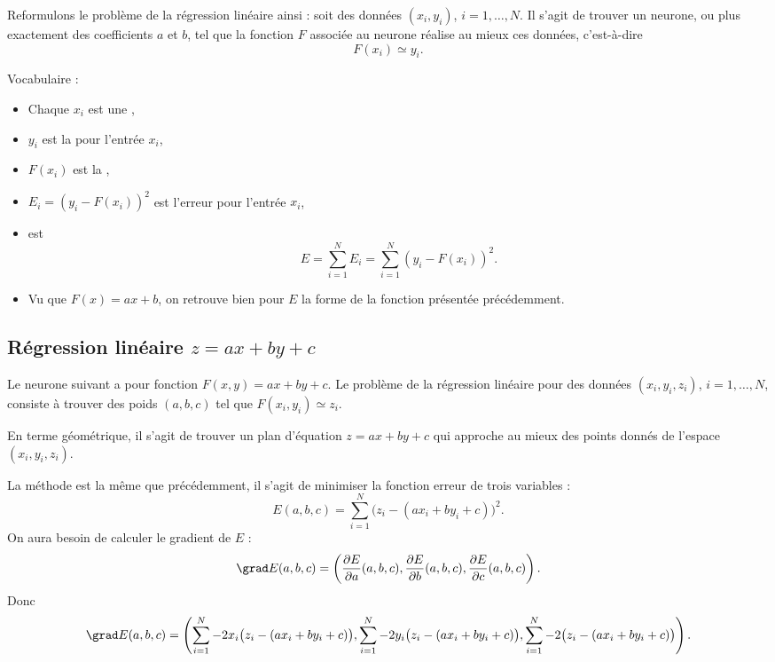 \documentclass[11pt,class=report,crop=false]{standalone}
\begin{document}
Reformulons le problème de la régression linéaire ainsi : soit des données $(x_i,y_i)$, $i=1,\ldots,N$. Il s'agit de trouver un neurone, ou plus exactement des coefficients $a$ et $b$, tel que la fonction $F$ associée au neurone réalise au mieux ces données, c'est-à-dire 
$$F(x_i) \simeq y_i.$$

Vocabulaire :
\begin{itemize}
  \item Chaque $x_i$ est une ,
  \item $y_i$ est la  pour l'entrée $x_i$,
  \item $F(x_i)$ est la ,
  \item $E_i = (y_i - F(x_i))^2$ est l'erreur pour l'entrée $x_i$,
  \item {} est $$E = \sum_{i=1}^N E_i =  \sum_{i=1}^N(y_i - F(x_i))^2.$$
  \item Vu que $F(x)=ax+b$, on retrouve bien pour $E$ la forme de la fonction présentée précédemment.
\end{itemize}


\subsection{Régression linéaire $z=ax+by+c$}

Le neurone suivant a pour fonction $F(x,y) = ax+by+c$.
Le problème de la régression linéaire pour des données $(x_i,y_i,z_i)$,  $i=1,\ldots,N$, consiste à trouver des poids $(a,b,c)$ tel que $F(x_i,y_i) \simeq z_i$.


En terme géométrique, il s'agit de trouver un plan d'équation $z=ax+by+c$ qui approche au mieux des points donnés de l'espace $(x_i,y_i,z_i)$. 



La méthode est la même que précédemment, il s'agit de minimiser la fonction erreur de trois variables :
$$E(a,b,c) = \sum_{i=1}^N \big(z_i - (ax_i+by_i+c)\big)^2.$$
On aura besoin de calculer le gradient de $E$ :
$$\grad E(a,b,c) 
= \left(\frac{\partial E}{\partial a}(a,b,c), \frac{\partial E}{\partial b}(a,b,c), \frac{\partial E}{\partial c}(a,b,c)\right).$$
Donc 
$$\grad E(a,b,c) 
= \left(
\sum_{i=1}^{N} -2x_i\big(z_i - (ax_i+by_i+c)\big),  
\sum_{i=1}^{N} -2y_i\big(z_i - (ax_i+by_i+c)\big), 
\sum_{i=1}^{N} -2\big(z_i - (ax_i+by_i+c)\big)
\right).$$
\end{document}
